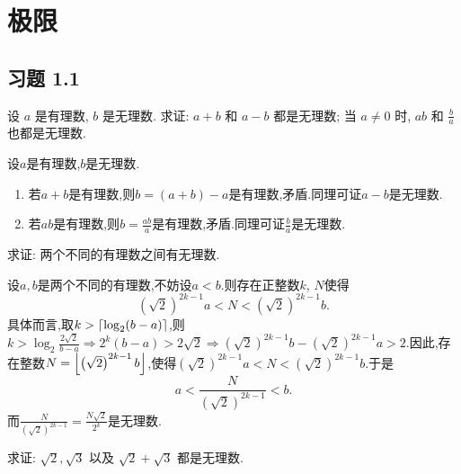 \chapter{极限}

\section{习题 1.1}

\begin{exercise}[1.1.1]
    设 $a$ 是有理数, $b$ 是无理数. 求证: $a+b$ 和 $a-b$ 都是无理数; 当 $a \ne 0$ 时, $ab$ 和 $\frac{b}{a}$ 也都是无理数.
\end{exercise}

\begin{solution}
    设$a$是有理数,$b$是无理数.
    \begin{enumerate}[(1)]
        \item 若$a+b$是有理数,则$b = (a+b)-a$是有理数,矛盾.同理可证$a-b$是无理数.
        \item 若$ab$是有理数,则$b = \frac{ab}{a}$是有理数,矛盾.同理可证$\frac{b}{a}$是无理数.
    \end{enumerate}
\end{solution}

\begin{exercise}[1.1.2]\label{exe:1.1.2}
    求证: 两个不同的有理数之间有无理数.
\end{exercise}

\begin{solution}
    设$a,b$是两个不同的有理数,不妨设$a < b$.则存在正整数$k$, $N$使得
    $$\left( \sqrt{2} \right)^{2k-1} a < N < \left( \sqrt{2} \right)^{2k-1} b.$$
    具体而言,取$k > \llceil \log_2 (b-a) \rrceil$,则$k > \log_2 \frac{2 \sqrt{2}}{b-a} \Rightarrow 2^k(b-a) > 2 \sqrt{2} \Rightarrow \left( \sqrt{2} \right)^{2k-1} b - \left( \sqrt{2} \right)^{2k-1} a > 2$.因此,存在整数$N = \llfloor \left( \sqrt{2} \right)^{2k-1} b \rrfloor$,使得$\left( \sqrt{2} \right)^{2k-1} a < N < \left( \sqrt{2} \right)^{2k-1} b$.于是
    $$a < \frac{N}{\left( \sqrt{2} \right)^{2k-1}} < b.$$
    而$\frac{N}{\left( \sqrt{2} \right)^{2k-1}} = \frac{N \sqrt{2}}{2^k}$是无理数.
\end{solution}

\begin{exercise}[1.1.3]
    求证: $\sqrt{2}, \sqrt{3}$ 以及 $\sqrt{2}+\sqrt{3}$ 都是无理数.
\end{exercise}

